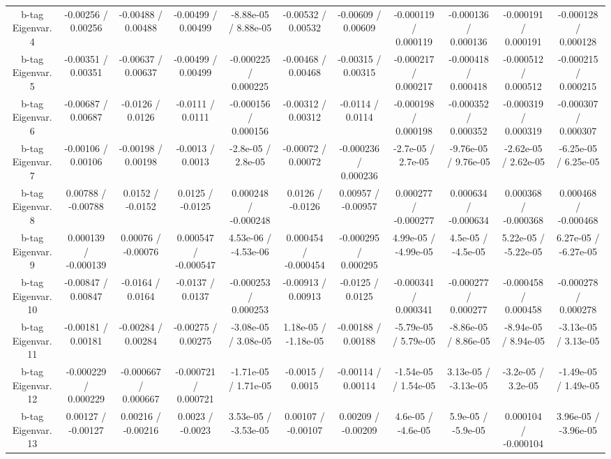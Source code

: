 \begin{table}[htbp]
\begin{center}
\begin{tabular}{|c|c|c|c|c|c|c|c|c|c|c|}
  b-tag Eigenvar. 4 & -0.00256 / 0.00256 & -0.00488 / 0.00488 & -0.00499 / 0.00499 & -8.88e-05 / 8.88e-05 & -0.00532 / 0.00532 & -0.00609 / 0.00609 & -0.000119 / 0.000119 & -0.000136 / 0.000136 & -0.000191 / 0.000191 & -0.000128 / 0.000128 \\ 
  b-tag Eigenvar. 5 & -0.00351 / 0.00351 & -0.00637 / 0.00637 & -0.00499 / 0.00499 & -0.000225 / 0.000225 & -0.00468 / 0.00468 & -0.00315 / 0.00315 & -0.000217 / 0.000217 & -0.000418 / 0.000418 & -0.000512 / 0.000512 & -0.000215 / 0.000215 \\ 
  b-tag Eigenvar. 6 & -0.00687 / 0.00687 & -0.0126 / 0.0126 & -0.0111 / 0.0111 & -0.000156 / 0.000156 & -0.00312 / 0.00312 & -0.0114 / 0.0114 & -0.000198 / 0.000198 & -0.000352 / 0.000352 & -0.000319 / 0.000319 & -0.000307 / 0.000307 \\ 
  b-tag Eigenvar. 7 & -0.00106 / 0.00106 & -0.00198 / 0.00198 & -0.0013 / 0.0013 & -2.8e-05 / 2.8e-05 & -0.00072 / 0.00072 & -0.000236 / 0.000236 & -2.7e-05 / 2.7e-05 & -9.76e-05 / 9.76e-05 & -2.62e-05 / 2.62e-05 & -6.25e-05 / 6.25e-05 \\ 
  b-tag Eigenvar. 8 & 0.00788 / -0.00788 & 0.0152 / -0.0152 & 0.0125 / -0.0125 & 0.000248 / -0.000248 & 0.0126 / -0.0126 & 0.00957 / -0.00957 & 0.000277 / -0.000277 & 0.000634 / -0.000634 & 0.000368 / -0.000368 & 0.000468 / -0.000468 \\ 
  b-tag Eigenvar. 9 & 0.000139 / -0.000139 & 0.00076 / -0.00076 & 0.000547 / -0.000547 & 4.53e-06 / -4.53e-06 & 0.000454 / -0.000454 & -0.000295 / 0.000295 & 4.99e-05 / -4.99e-05 & 4.5e-05 / -4.5e-05 & 5.22e-05 / -5.22e-05 & 6.27e-05 / -6.27e-05 \\ 
  b-tag Eigenvar. 10 & -0.00847 / 0.00847 & -0.0164 / 0.0164 & -0.0137 / 0.0137 & -0.000253 / 0.000253 & -0.00913 / 0.00913 & -0.0125 / 0.0125 & -0.000341 / 0.000341 & -0.000277 / 0.000277 & -0.000458 / 0.000458 & -0.000278 / 0.000278 \\ 
  b-tag Eigenvar. 11 & -0.00181 / 0.00181 & -0.00284 / 0.00284 & -0.00275 / 0.00275 & -3.08e-05 / 3.08e-05 & 1.18e-05 / -1.18e-05 & -0.00188 / 0.00188 & -5.79e-05 / 5.79e-05 & -8.86e-05 / 8.86e-05 & -8.94e-05 / 8.94e-05 & -3.13e-05 / 3.13e-05 \\ 
  b-tag Eigenvar. 12 & -0.000229 / 0.000229 & -0.000667 / 0.000667 & -0.000721 / 0.000721 & -1.71e-05 / 1.71e-05 & -0.0015 / 0.0015 & -0.00114 / 0.00114 & -1.54e-05 / 1.54e-05 & 3.13e-05 / -3.13e-05 & -3.2e-05 / 3.2e-05 & -1.49e-05 / 1.49e-05 \\ 
  b-tag Eigenvar. 13 & 0.00127 / -0.00127 & 0.00216 / -0.00216 & 0.0023 / -0.0023 & 3.53e-05 / -3.53e-05 & 0.00107 / -0.00107 & 0.00209 / -0.00209 & 4.6e-05 / -4.6e-05 & 5.9e-05 / -5.9e-05 & 0.000104 / -0.000104 & 3.96e-05 / -3.96e-05 \\ 

\end{tabular}
\end{center}
\end{table}

